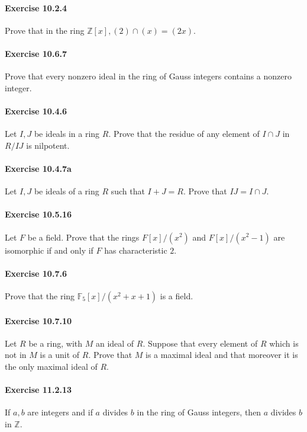 \documentclass{article}
\begin{document}
\paragraph{Exercise 10.2.4} Prove that in the ring $\mathbb{Z}[x],(2) \cap(x)=(2 x)$.


\paragraph{Exercise 10.6.7} Prove that every nonzero ideal in the ring of Gauss integers contains a nonzero integer.


\paragraph{Exercise 10.4.6} Let $I, J$ be ideals in a ring $R$. Prove that the residue of any element of $I \cap J$ in $R / I J$ is nilpotent.


\paragraph{Exercise 10.4.7a} Let $I, J$ be ideals of a ring $R$ such that $I+J=R$. Prove that $I J=I \cap J$.


\paragraph{Exercise 10.5.16} Let $F$ be a field. Prove that the rings $F[x] /\left(x^2\right)$ and $F[x] /\left(x^2-1\right)$ are isomorphic if and only if $F$ has characteristic $2 .$


\paragraph{Exercise 10.7.6} Prove that the ring $\mathbb{F}_5[x] /\left(x^2+x+1\right)$ is a field.


\paragraph{Exercise 10.7.10} Let $R$ be a ring, with $M$ an ideal of $R$. Suppose that every element of $R$ which is not in $M$ is a unit of $R$. Prove that $M$ is a maximal ideal and that moreover it is the only maximal ideal of $R$.


\paragraph{Exercise 11.2.13} If $a, b$ are integers and if $a$ divides $b$ in the ring of Gauss integers, then $a$ divides $b$ in $\mathbb{Z}$.
\end{document}
